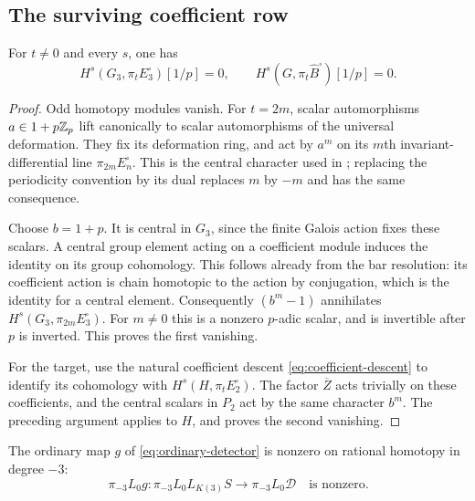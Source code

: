 \subsection{The surviving coefficient row}

\begin{lemma}\label{lem:central-weights}
For $t\ne0$ and every $s$, one has
\[
 H^s(G_3,\pi_tE_3^{\square})[1/p]=0,
 \qquad
 H^s(G,\pi_t\widehat B^{\square})[1/p]=0.
\]
\end{lemma}

\begin{proof}
Odd homotopy modules vanish.  For $t=2m$, scalar automorphisms
$a\in1+p\mathbb Z_p$ lift canonically to scalar automorphisms of the universal
deformation.  They fix its deformation ring, and act by $a^m$ on its
$m$th invariant-differential line $\pi_{2m}E_n^{\square}$.
This is the central character used in
\cite[Lemma~2.6.1]{BSSW2025}; replacing the periodicity convention by its
dual replaces $m$ by $-m$ and has the same consequence.

Choose $b=1+p$.  It is central in $G_3$, since the finite Galois action
fixes these scalars.  A central group element acting on a coefficient
module induces the identity on its group cohomology.  This follows
already from the bar resolution: its coefficient action is chain
homotopic to the action by conjugation, which is the identity for a
central element.  Consequently $(b^m-1)$ annihilates
$H^s(G_3,\pi_{2m}E_3^{\square})$.  For $m\ne0$ this is a nonzero
$p$-adic scalar, and is invertible after $p$ is inverted.  This proves
the first vanishing.

For the target, use the natural coefficient descent
\eqref{eq:coefficient-descent} to identify its cohomology with
$H^s(H,\pi_tE_2^{\square})$.  The factor $\overline Z$ acts trivially
on these coefficients, and the central scalars in $P_2$ act by the same
character $b^m$.  The preceding argument applies to $H$, and proves
the second vanishing.
\end{proof}

\begin{proposition}\label{prop:nonzero-detector}
The ordinary map $g$ of \eqref{eq:ordinary-detector} is nonzero on
rational homotopy in degree $-3$:
\[
 \pi_{-3}L_0g:\pi_{-3}L_0L_{K(3)}S
                    \longrightarrow\pi_{-3}L_0\mathcal D
 \quad\text{is nonzero}.
\]
\end{proposition}

